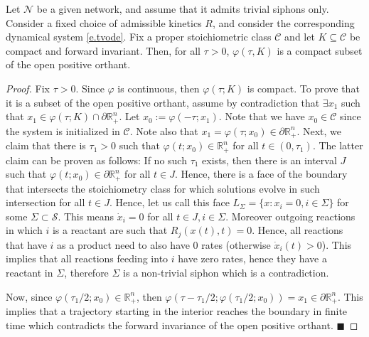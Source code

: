 \documentclass[onefignum,onetabnum]{siamonline220329}
\newcommand{\Ss}{{\mathscr S}}
\newcommand{\Ns}{{\mathscr N}}
\newcommand{\Cs}{\mathscr C}
\begin{document}
{\begin{lemma}\label{lem.sep}
	Let $\Ns$ be a given network, and assume that it admits trivial siphons only. Consider a fixed choice of admissible kinetics $R$, and consider the corresponding dynamical system \eqref{e.tvode}.   Fix a proper stoichiometric class $\Cs$ and let $K \subseteq \Cs$ be compact and forward invariant.  Then, for all $\tau>0$, $\varphi(\tau,K)$ is a compact subset of the open positive orthant. %
\end{lemma}
\begin{proof} 
	Fix $\tau >0$. Since $\varphi$ is continuous, then $\varphi(\tau;K)$ is compact. %
	To prove that it is a subset of the open positive orthant, assume by contradiction that $\exists x_1$ such that $x_1 \in \varphi(\tau;K) \cap \partial \mathbb R_{+}^n$. Let $x_0:=\varphi(-\tau;x_1)$. {Note that} we have $x_0\in \Cs$ {since the system is initialized in $\Cs$}. Note also that $x_1=\varphi(\tau;x_0) \in \partial \mathbb R_{+}^n$. Next, we claim that there is $\tau_1>0$ such that $\varphi(t;x_0) \in \mathbb R_+^n$ for all $t\in (0,\tau_1)$. The latter claim can be proven as follows: If no such $\tau_1$ exists, then there {is} an interval $J$ such that  $\varphi(t;x_0) \in \partial \mathbb R_+^n$ for all $t \in J$.   Hence, there is a face of the boundary that intersects the stoichiometry class  for which solutions evolve in such intersection for all $t \in J$. Hence, let us call this face $L_\Sigma=\{x: x_i=0, i\in \Sigma\}$ for some  $\Sigma\subset \Ss$. This means $\dot x_i=0$ for all $t \in J, i \in \Sigma$.%
	 Moreover outgoing reactions in which $i$ is a reactant are such that $R_j(x(t),t)=0$. Hence, all reactions that have $i$ as a product need to also have 0 rates (otherwise $\dot{x}_i(t) > 0$).
	This implies that all reactions feeding into $i$ have zero rates, hence they have a reactant in $\Sigma$, therefore $\Sigma$ is {a} non-trivial siphon which is a contradiction.
	
	Now, since $\varphi(\tau_1/2;x_0)\in \mathbb R_+^n$, then $\varphi(\tau - \tau_1/2; \varphi(\tau_1/2;x_0) )=x_1 \in \partial \mathbb R_+^n$. This implies that a trajectory starting in the interior reaches the boundary in finite time which contradicts the forward invariance of the open positive orthant. \hfill $\blacksquare$
	

\end{proof}}
\end{document}
